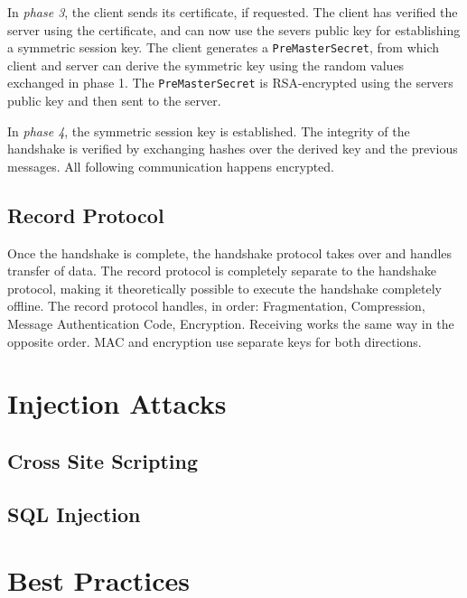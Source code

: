 In \emph{phase 3}, the client sends its certificate, if requested. The client
has verified the server using the certificate, and can now use the severs public
key for establishing a symmetric session key. The client generates a
\texttt{PreMasterSecret}, from which client and server can derive the symmetric
key using the random values exchanged in phase 1. The \texttt{PreMasterSecret}
is RSA-encrypted using the servers public key and then sent to the server.

In \emph{phase 4}, the symmetric session key is established. The integrity of
the handshake is verified by exchanging hashes over the derived key and the
previous messages. All following communication happens encrypted.

\subsection{Record Protocol}
Once the handshake is complete, the handshake protocol takes over and handles
transfer of data. The record protocol is completely separate to the handshake
protocol, making it theoretically possible to execute the handshake completely
offline. The record protocol handles, in order: Fragmentation, Compression,
Message Authentication Code, Encryption. Receiving works the same way in the
opposite order. MAC and encryption use separate keys for both directions.

\section{Injection Attacks}
\subsection{Cross Site Scripting}
\subsection{SQL Injection}
\section{Best Practices}